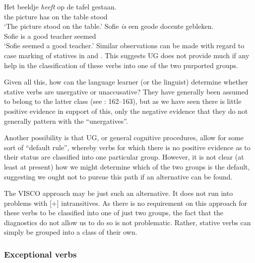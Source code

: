 \documentclass[output=paper]{langsci/langscibook}
\begin{document}
\ea {} \parencite[870]{Sorace2000}
    \ea
        \gll    Het   beeldje \textit{heeft} op   de   tafel   gestaan.\\
                the   picture   has   on   the   table   stood\\
        \glt    \enquote*{The picture stood on the table.}
    \ex
        \gll   Sofie \textit{is} een   geode   docente   gebleken.\\
               Sofie is a   good   teacher   seemed\\
        \glt   \enquote*{Sofie seemed a good teacher.}
    \z
\z
Similar observations can be made with regard to case marking of statives in
 and  \parencite{Baker2018}. This suggests
\gls{UG} does not provide much if any help in the
classification of these verbs into one of the two purported groups.

Given all this, how can the language learner (or the linguist) determine
whether  stative verbs are unergative or unaccusative? They have
generally been assumed to belong to the latter class (see
\citealt{Perlmutter1978}: 162–163), but as we have seen there is little
positive evidence in support of this, only the negative evidence that they do
not generally pattern with the \enquote{unergatives}.

Another possibility is that \gls{UG}, or general cognitive procedures, allow for some
sort of \enquote{default rule}, whereby verbs for which there is no positive
evidence as to their status are classified into one particular group. However,
it is not clear (at least at present) how we might determine which of the two
groups is the default, suggesting we ought not to pursue this path if an
alternative can be found.

The VISCO approach may be just such an alternative. It does not run into
problems with [$+$\State{}] intransitives. As there is no requirement on this
approach for these verbs to be classified into one of just two groups, the fact
that the diagnostics do not allow us to do so is not problematic. Rather,
stative verbs can simply be grouped into a class of their own.

\subsubsection{Exceptional verbs}\label{sec:baker:3.4.5}
\end{document}
